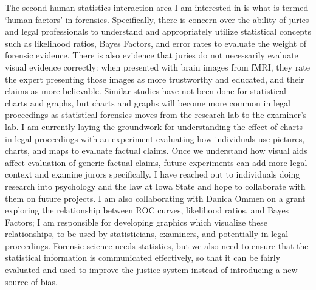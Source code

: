\documentclass[12pt, letterpaper, sans]{moderncv}
\begin{document}
The second human-statistics interaction area I am interested in is what is termed `human factors' in forensics. Specifically, there is concern over the ability of juries and legal professionals to understand and appropriately utilize statistical concepts such as likelihood ratios, Bayes Factors, and error rates to evaluate the weight of forensic evidence. There is also evidence that juries do not necessarily evaluate visual evidence correctly: when presented with brain images from fMRI, they rate the expert presenting those images as more trustworthy and educated, and their claims as more believable. Similar studies have not been done for statistical charts and graphs, but charts and graphs will become more common in legal proceedings as statistical forensics moves from the research lab to the examiner's lab. I am currently laying the groundwork for understanding the effect of charts in legal proceedings with an experiment evaluating how individuals use pictures, charts, and maps to evaluate factual claims. Once we understand how visual aids affect evaluation of generic factual claims, future experiments can add more legal context and examine jurors specifically. I have reached out to individuals doing research into psychology and the law at Iowa State and hope to collaborate with them on future projects. I am also collaborating with Danica Ommen on a grant exploring the relationship between ROC curves, likelihood ratios, and Bayes Factors; I am responsible for developing graphics which visualize these relationships, to be used by statisticians, examiners, and potentially in legal proceedings. Forensic science needs statistics, but we also need to ensure that the statistical information is communicated effectively, so that it can be fairly evaluated and used to improve the justice system instead of introducing a new source of bias. 
\end{document}
